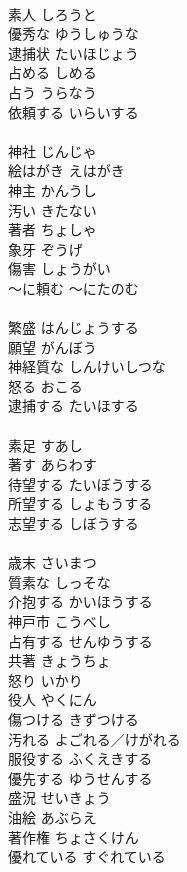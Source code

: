 \documentclass[8pt]{extreport}
\begin{document}
\begin{CJK}{UTF8}{min}
\\	素人	しろうと	
\\	優秀な	ゆうしゅうな	
\\	逮捕状	たいほじょう	
\\	占める	しめる	
\\	占う	うらなう	
\\	依頼する	いらいする	
\\	[漢語]
\\	神社	じんじゃ	
\\	絵はがき	えはがき	
\\	神主	かんうし	
\\	汚い	きたない	
\\	著者	ちょしゃ	
\\	象牙	ぞうげ	
\\	傷害	しょうがい	
\\	～に頼む	～にたのむ	
\\	[和語]
\\	繁盛	はんじょうする	
\\	願望	がんぼう	
\\	神経質な	しんけいしつな	
\\	怒る	おこる	
\\	逮捕する	たいほする	
\\	[漢語]
\\	素足	すあし	
\\	著す	あらわす	
\\	待望する	たいぼうする	
\\	所望する	しょもうする	
\\	志望する	しぼうする	
\\	[漢語]
\\	歳末	さいまつ	
\\	質素な	しっそな	
\\	介抱する	かいほうする	
\\	神戸市	こうべし	
\\	占有する	せんゆうする	
\\	共著	きょうちょ	
\\	怒り	いかり	
\\	役人	やくにん	
\\	傷つける	きずつける	
\\	汚れる	よごれる／けがれる	
\\	服役する	ふくえきする	
\\	優先する	ゆうせんする	
\\	盛況	せいきょう	
\\	油絵	あぶらえ	
\\	著作権	ちょさくけん	
\\	優れている	すぐれている	

\end{CJK}
\end{document}
